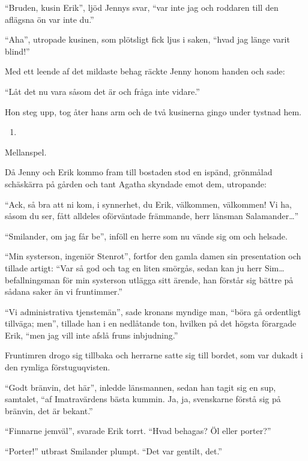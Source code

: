 ``Bruden, kusin Erik'', ljöd Jennys svar, ``var inte jag och roddaren
till den aflägsna ön var inte du.''

``Aha'', utropade kusinen, som plötsligt fick ljus i saken, ``hvad jag
länge varit blind!''

Med ett leende af det mildaste behag räckte Jenny honom handen och sade:

``Låt det nu vara såsom det är och fråga inte vidare.''

Hon steg upp, tog åter hans arm och de två kusinerna gingo under tystnad
hem.

\begin{enumerate}
\def\labelenumi{\arabic{enumi}.}
\setcounter{enumi}{16}
\tightlist
\item
\end{enumerate}

Mellanspel.

Då Jenny och Erik kommo fram till bostaden stod en ispänd, grönmålad
schäskärra på gården och tant Agatha skyndade emot dem, utropande:

``Ack, så bra att ni kom, i synnerhet, du Erik, välkommen, välkommen! Vi
ha, såsom du ser, fått alldeles oförväntade främmande, herr länsman
Salamander\ldots{}''

``Smilander, om jag får be'', inföll en herre som nu vände sig om och
helsade.

``Min systerson, ingeniör Stenrot'', fortfor den gamla damen sin
presentation och tillade artigt: ``Var så god och tag en liten smörgås,
sedan kan ju herr Sim\ldots{} befallningsman för min systerson utlägga
sitt ärende, han förstår sig bättre på sådana saker än vi fruntimmer.''

``Vi administrativa tjenstemän'', sade kronans myndige man, ``böra gå
ordentligt tillväga; men'', tillade han i en nedlåtande ton, hvilken på
det högsta förargade Erik, ``men jag vill inte afslå fruns inbjudning.''

Fruntimren drogo sig tillbaka och herrarne satte sig till bordet, som
var dukadt i den rymliga förstuguqvisten.

``Godt bränvin, det här'', inledde länsmannen, sedan han tagit sig en
sup, samtalet, ``af Imatravärdens bästa kummin. Ja, ja, svenskarne
förstå sig på bränvin, det är bekant.''

``Finnarne jemväl'', svarade Erik torrt. ``Hvad behagas? Öl eller
porter?''

``Porter!'' utbrast Smilander plumpt. ``Det var gentilt, det.''

